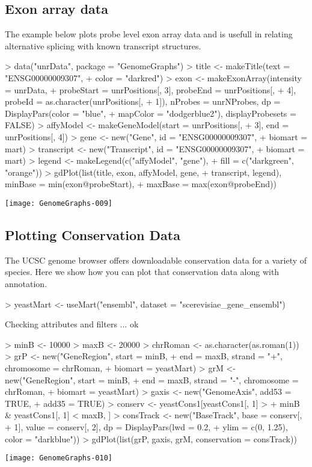 \documentclass[11pt]{article}
\begin{document}
\subsection{Exon array data}

The example below plots probe level exon array data and is usefull in
relating alternative splicing with known transcript structures.

\begin{Schunk}
\begin{Sinput}
> data("unrData", package = "GenomeGraphs")
> title <- makeTitle(text = "ENSG00000009307", 
+     color = "darkred")
> exon <- makeExonArray(intensity = unrData, 
+     probeStart = unrPositions[, 3], probeEnd = unrPositions[, 
+         4], probeId = as.character(unrPositions[, 
+         1]), nProbes = unrNProbes, dp = DisplayPars(color = "blue", 
+         mapColor = "dodgerblue2"), displayProbesets = FALSE)
> affyModel <- makeGeneModel(start = unrPositions[, 
+     3], end = unrPositions[, 4])
> gene <- new("Gene", id = "ENSG00000009307", 
+     biomart = mart)
> transcript <- new("Transcript", id = "ENSG00000009307", 
+     biomart = mart)
> legend <- makeLegend(c("affyModel", "gene"), 
+     fill = c("darkgreen", "orange"))
> gdPlot(list(title, exon, affyModel, gene, 
+     transcript, legend), minBase = min(exon@probeStart), 
+     maxBase = max(exon@probeEnd))
\end{Sinput}
\end{Schunk}
\texttt{[image: GenomeGraphs-009]}

\subsection{Plotting Conservation Data}
The UCSC genome browser offers downloadable conservation data for a
variety of species. Here we show how you can plot that conservation
data along with annotation. 

\begin{Schunk}
\begin{Sinput}
> yeastMart <- useMart("ensembl", dataset = "scerevisiae_gene_ensembl")
\end{Sinput}
\begin{Soutput}
Checking attributes and filters ... ok
\end{Soutput}
\begin{Sinput}
> minB <- 10000
> maxB <- 20000
> chrRoman <- as.character(as.roman(1))
> grP <- new("GeneRegion", start = minB, 
+     end = maxB, strand = "+", chromosome = chrRoman, 
+     biomart = yeastMart)
> grM <- new("GeneRegion", start = minB, 
+     end = maxB, strand = "-", chromosome = chrRoman, 
+     biomart = yeastMart)
> gaxis <- new("GenomeAxis", add53 = TRUE, 
+     add35 = TRUE)
> conserv <- yeastCons1[yeastCons1[, 1] > 
+     minB & yeastCons1[, 1] < maxB, ]
> consTrack <- new("BaseTrack", base = conserv[, 
+     1], value = conserv[, 2], dp = DisplayPars(lwd = 0.2, 
+     ylim = c(0, 1.25), color = "darkblue"))
> gdPlot(list(grP, gaxis, grM, conservation = consTrack))
\end{Sinput}
\end{Schunk}
\texttt{[image: GenomeGraphs-010]}
\end{document}
